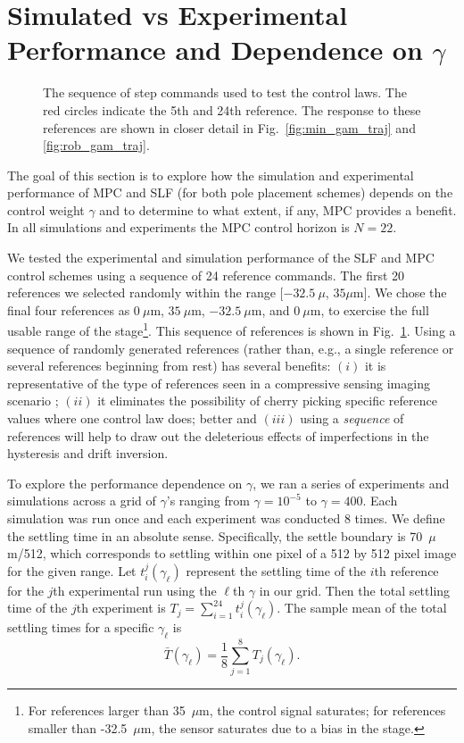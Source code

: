 \documentclass[twocolumn,twoside]{IEEEtran}
\begin{document}
\section{Simulated vs Experimental Performance and Dependence on $\gamma$}\label{sec:results}
\begin{figure}[ht!]
  
  \caption{The sequence of step commands used to test the control laws. The red circles indicate the 5th and 24th reference. The response to these references are shown in closer detail in Fig.~\ref{fig:min_gam_traj} and \ref{fig:rob_gam_traj}.}
  \label{fig:steps}
\end{figure}
The goal of this section is to explore how the simulation and experimental performance of MPC and SLF (for both pole placement schemes) depends on the control weight $\gamma$ and to determine to what extent, if any, MPC provides a benefit. In all simulations and experiments the MPC control horizon is $N=22$.

We tested the experimental and simulation performance of the SLF and MPC control schemes using 
a sequence of 24 reference commands. The first 20 references we selected randomly within the range $[-32.5~\mu$, $35\mu\text{m}]$. We chose the final four references as $0~\mu$m, $35~\mu$m, $-32.5~\mu$m, and $0~\mu$m, to exercise the full usable range of the stage\footnote{For references larger than 35~$\mu$m, the control signal saturates; for references smaller than -32.5~$\mu$m, the sensor saturates due to a bias in the stage.}. This sequence of references is shown in Fig.~\ref{fig:steps}. Using a sequence of randomly generated references (rather than, e.g., a single reference or several references beginning from rest) has several benefits: $(i)$ it is representative of the type of references seen in a compressive sensing imaging scenario \cite{braker_hardware_2018}; $(ii)$ it eliminates the possibility of cherry picking specific reference values where one control law does; better and $(iii)$ using a \emph{sequence} of references will help to draw out the deleterious effects of imperfections in the hysteresis and drift inversion.

To explore the performance dependence on $\gamma$, we ran a series of experiments and simulations across a grid of $\gamma$'s ranging from $\gamma=10^{-5}$ to $\gamma=400$. 
Each simulation was run once and each experiment was conducted 8 times. 
We define the settling time in an absolute sense. Specifically, the settle boundary is 70~$\mu$m/512, which corresponds to settling within one pixel of a 512 by 512 pixel image for the given range.
Let $t_i^j(\gamma_{\ell})$ represent the settling time of the $i$th reference for the $j$th experimental run using the $\ell$th $\gamma$ in our grid. Then the total settling time of the $j$th experiment is $T_j = \sum_{i=1}^{24} t_i^j(\gamma_{\ell})$. The sample mean of the total settling times for a specific $\gamma_{\ell}$ is
\begin{equation}
  \bar{T}(\gamma_{\ell}) = \frac{1}{8}\sum_{j=1}^8 T_j(\gamma_{\ell}).
\end{equation}
\end{document}

